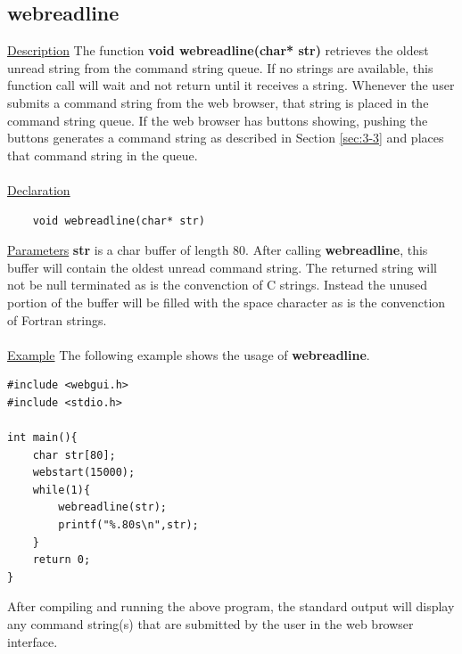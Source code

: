 \newpage
\subsection{webreadline}
\label{sec:2-7}
\underline{Description} The function \textbf{void webreadline(char* str)} retrieves the oldest unread string from the
command string queue. If no strings are available, this function call will wait and not return until it receives
a string. Whenever the user submits a command string from the web browser, that string is placed in the command string
queue. If the web browser has buttons showing, pushing the buttons generates a command string as described
in Section \ref{sec:3-3} and places that command string in the queue.\\
\\
\underline{Declaration}
\begin{verbatim} 
	void webreadline(char* str)
\end{verbatim}
\underline{Parameters} \textbf{str} is a char buffer of length 80. After calling \textbf{webreadline}, this buffer
will contain the oldest unread command string. The returned string will not be null terminated as is the convenction
of C strings. Instead the unused portion of the buffer will be filled with the space character as is the convenction of
Fortran strings.\\
\\
\underline{Example} The following example shows the usage of \textbf{webreadline}.
\begin{verbatim}
#include <webgui.h>
#include <stdio.h>

int main(){
    char str[80];
    webstart(15000);
    while(1){
        webreadline(str);
        printf("%.80s\n",str);
    }
    return 0;
}
\end{verbatim}
After compiling and running the above program, the standard output will display any command string(s) that are
submitted by the user in the web browser interface.

\newpage
